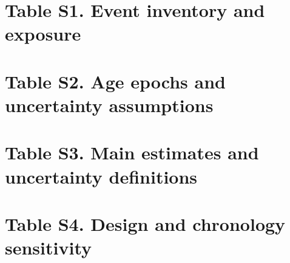 \documentclass[11pt]{article}
\begin{document}
\clearpage
\setcounter{table}{0}\label{tab:S1}
\section*{Table S1. Event inventory and exposure}

\clearpage
\setcounter{table}{1}\label{tab:S2}
\section*{Table S2. Age epochs and uncertainty assumptions}

\clearpage
\setcounter{table}{2}\label{tab:S3}
\section*{Table S3. Main estimates and uncertainty definitions}

\clearpage
\setcounter{table}{3}\label{tab:S4}
\section*{Table S4. Design and chronology sensitivity}

\clearpage
\setcounter{table}{4}\label{tab:S5}
\end{document}
